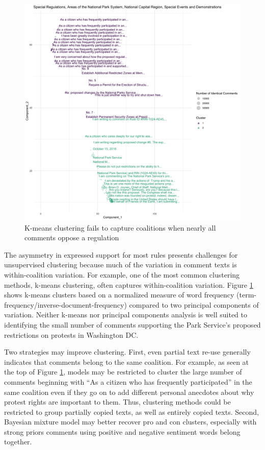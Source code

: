 \documentclass[
      12pt,
        ]{article}
\begin{document}
\begin{figure}

{\centering \includegraphics[width=6.5in]{../Figs/kmeans} 

}

\caption{K-means clustering fails to capture coalitions when nearly all comments oppose a regulation}\label{fig:kmeans}
\end{figure}

The asymmetry in expressed support for most rules presents challenges
for unsupervised clustering because much of the variation in comment
texts is within-coalition variation. For example, one of the most common
clustering methods, k-means clustering, often captures within-coalition
variation. Figure \ref{fig:kmeans} shows k-means clusters based on a normalized
measure of word frequency (term-frequency/inverse-document-frequency)
compared to two principal components of variation. Neither k-means nor
principal components analysis is well suited to identifying the small
number of comments supporting the Park Service's proposed restrictions
on protests in Washington DC.

Two strategies may improve clustering. First, even partial text re-use
generally indicates that comments belong to the same coalition. For
example, as seen at the top of Figure
\ref{fig:kmeans}, models
may be restricted to cluster the large number of comments beginning with
``As a citizen who has frequently participated'' in the same coalition
even if they go on to add different personal anecdotes about why protest
rights are important to them. Thus, clustering methods could be
restricted to group partially copied texts, as well as entirely copied
texts. Second, Bayesian mixture model may better recover pro and con
clusters, especially with strong priors comments using positive and
negative sentiment words belong together.
\end{document}

